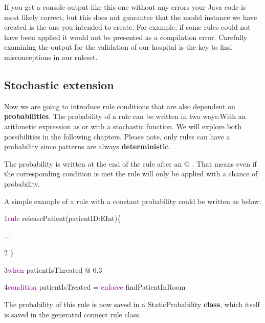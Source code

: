 If you get a console output like this one without any errors your Java code is most likely correct, but this does not guarantee that the model instance we have created is the one you intended to create.\newline
For example, if some rules could not have been applied it would not be presented as a compilation error. Carefully examining the output for the validation of our hospital is the key to find misconceptions in our ruleset.

\clearpage

\subsection{Stochastic extension}

Now we are going to introduce rule conditions that are also dependent on \textbf{probabilities}.
The probability of a rule can be written in two ways:\newline With an arithmetic expression as or with a stochastic function. We will explore both possibilities in the following chapters.\newline
Please note, only rules can have a probability since patterns are always \textbf{deterministic}.

The probability is written at the end of the rule after an \textsf{@} . That means even if the corresponding condition is met the rule will only be applied with a chance of \textsf{probability}.
\newline

A simple example of a rule with a constant probability could be written as below:\newline

{

1\hspace{0.5cm}\textcolor{Purple}{rule} releasePatient(patientID:EInt)\{

\hspace{0.75cm}...

2\hspace{0.5cm} \}

3\hspace{0.5cm}\textcolor{Purple}{when} patientIsThreated @ 0.3 

4\hspace{0.5cm}\textcolor{Purple}{condition} patientIsTreated = \textcolor{Purple}{enforce}  findPatientInRoom \newline
}

The probability of this rule is now saved in a \textsf{StaticProbability} \textbf{class}, which itself is saved in the generated connect rule class.\newline


